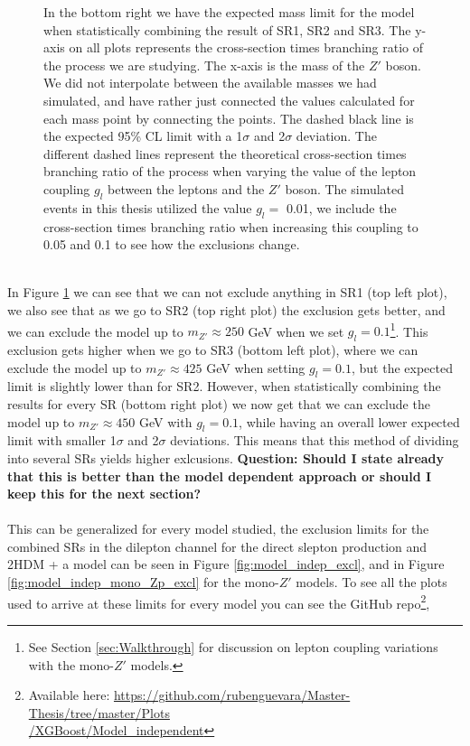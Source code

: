 \documentclass[12pt, a4paper]{book}
\begin{document}
\begin{figure}[!ht]
{   In the bottom right we have the expected mass limit for the model when statistically combining the result of SR1, SR2 and SR3. 
   The y-axis on all plots represents the cross-section times branching ratio of the process we are studying. The x-axis is the mass of the $Z'$ boson. We did not interpolate between the available masses we had simulated, 
   and have rather just connected the values calculated for each mass point by connecting the points. The dashed black line is the expected 95\% CL limit with a 1$\sigma$ and 2$\sigma$ deviation. 
   The different dashed lines represent the theoretical cross-section times branching ratio of the process when varying the value of the lepton coupling $g_l$ between the leptons and the $Z'$ boson. The simulated events in this thesis utilized the value $g_l=$ 0.01, we include the cross-section times branching ratio when increasing this coupling to 0.05 and 0.1 to see how the exclusions change. }\label{fig:DH_HDS_me_SRS}
\end{figure} 
\\In Figure \ref{fig:DH_HDS_me_SRS} we can see that we can not exclude anything in SR1 (top left plot), we also see that as we go to SR2 (top right plot) the exclusion gets better, and we can exclude the model up to $m_{Z'}\approx250$ GeV when we set $g_l=0.1$\footnote{See Section \ref{sec:Walkthrough} for discussion on lepton coupling variations with the mono-$Z'$ models.}. 
This exclusion gets higher when we go to SR3 (bottom left plot), where we can exclude the model up to $m_{Z'}\approx425$ GeV when setting $g_l=0.1$, but the expected limit is slightly lower than for SR2. However, when statistically combining the results for every SR (bottom right plot) we now get that we can exclude the model up to $m_{Z'}\approx450$ GeV with $g_l=0.1$,
while having an overall lower expected limit with smaller 1$\sigma$ and 2$\sigma$ deviations. This means that this method of dividing into several SRs yields higher exlcusions. \textbf{Question: Should I state already that this is better than the model dependent approach or should I keep this for the next section?}\\
\\ This can be generalized for every model studied, the exclusion limits for the combined SRs in the dilepton channel for the direct slepton production and 2HDM + a model can be seen in Figure \ref{fig:model_indep_excl}, and in Figure \ref{fig:model_indep_mono_Zp_excl} for the mono-$Z'$ models.
To see all the plots used to arrive at these limits for every model you can see the GitHub repo\footnote{Available here: \href{https://github.com/rubenguevara/Master-Thesis/tree/master/Plots/XGBoost/Model_independent}{https://github.com/rubenguevara/Master-Thesis/tree/master/Plots\\/XGBoost/Model\_independent}}, 
\end{document}
